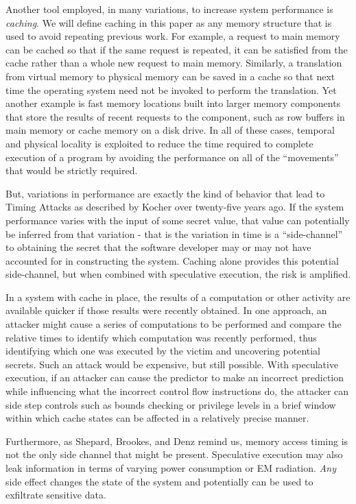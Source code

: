 \documentclass[11pt,conference]{IEEEtran}
\begin{document}
Another tool employed, in many variations, to increase system performance is \emph{caching}.
We will define caching in this paper as any memory structure that is used to avoid repeating previous work.
For example, a request to main memory can be cached so that if the same request is repeated, it can be satisfied from the cache rather than a whole new request to main memory.
Similarly, a translation from virtual memory to physical memory can be saved in a cache so that next time the operating system need not be invoked to perform the translation.
Yet another example is fast memory locations built into larger memory components that store the results of recent requests to the component, such as row buffers in main memory or cache memory on a disk drive.
In all of these cases, temporal and physical locality is exploited to reduce the time required to complete execution of a program by avoiding the performance on all of the ``movements'' that would be strictly required.

But, variations in performance are exactly the kind of behavior that lead to Timing Attacks as described by Kocher over twenty-five years ago\cite{kocher96}.
If the system performance varies with the input of some secret value, that value can potentially be inferred from that variation - that is the variation in time is a ``side-channel'' to obtaining the secret that the software developer may or may not have accounted for in constructing the system.
Caching alone provides this potential side-channel\cite{shepherd2022transient}, but when combined with speculative execution, the risk is amplified.

In a system with cache in place, the results of a computation or other activity are available quicker if those results were recently obtained.
In one approach, an attacker might cause a series of computations to be performed and compare the relative times to identify which computation was recently performed, thus identifying which one was executed by the victim and uncovering potential secrets.
Such an attack would be expensive, but still possible.
With speculative execution, if an attacker can cause the predictor to make an incorrect prediction while influencing what the incorrect control flow instructions do, the attacker can side step controls such as bounds checking or privilege levels in a brief window within which cache states can be affected in a relatively precise manner.

Furthermore, as Shepard, Brookes, and Denz\cite{shepherd2022transient} remind us, memory access timing is not the only side channel that might be present.
Speculative execution may also leak information in terms of varying power consumption or EM radiation.
\emph{Any} side effect changes the state of the system and potentially can be used to exfiltrate sensitive data.
\end{document}
